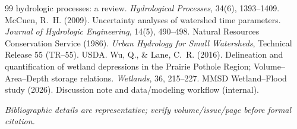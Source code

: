 \documentclass[11pt]{article}
\begin{document}
\begin{thebibliography}{99}
hydrologic processes: a review. \emph{Hydrological Processes}, 34(6), 1393--1409.
 McCuen, R.~H. (2009). Uncertainty analyses of watershed time
parameters. \emph{Journal of Hydrologic Engineering}, 14(5), 490--498.
 Natural Resources Conservation Service (1986). \emph{Urban Hydrology
for Small Watersheds}, Technical Release 55 (TR--55). USDA.
 Wu, Q., \& Lane, C.~R. (2016). Delineation and quantification of
wetland depressions in the Prairie Pothole Region; Volume--Area--Depth storage relations.
\emph{Wetlands}, 36, 215--227.
 MMSD Wetland--Flood study (2026). Discussion
note and data/modeling workflow (internal).
\end{thebibliography}
\emph{\footnotesize Bibliographic details are representative; verify volume/issue/page before
formal citation.}
\end{document}
